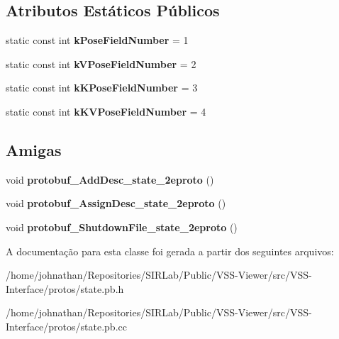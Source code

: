 \subsection*{Atributos Estáticos Públicos}
\begin{DoxyCompactItemize}
\item 
static const int {\bfseries k\+Pose\+Field\+Number} = 1\hypertarget{classvss__state_1_1Ball__State_aa0d51eebda087326095eff02cc80481c}{}\label{classvss__state_1_1Ball__State_aa0d51eebda087326095eff02cc80481c}

\item 
static const int {\bfseries k\+V\+Pose\+Field\+Number} = 2\hypertarget{classvss__state_1_1Ball__State_aa9df3d7a047296c119dfc35ae5e86b54}{}\label{classvss__state_1_1Ball__State_aa9df3d7a047296c119dfc35ae5e86b54}

\item 
static const int {\bfseries k\+K\+Pose\+Field\+Number} = 3\hypertarget{classvss__state_1_1Ball__State_a31603cacf64917d3088585f33290114a}{}\label{classvss__state_1_1Ball__State_a31603cacf64917d3088585f33290114a}

\item 
static const int {\bfseries k\+K\+V\+Pose\+Field\+Number} = 4\hypertarget{classvss__state_1_1Ball__State_a8d49de5cec51b6a22e828da61fa8810b}{}\label{classvss__state_1_1Ball__State_a8d49de5cec51b6a22e828da61fa8810b}

\end{DoxyCompactItemize}
\subsection*{Amigas}
\begin{DoxyCompactItemize}
\item 
void {\bfseries protobuf\+\_\+\+Add\+Desc\+\_\+state\+\_\+2eproto} ()\hypertarget{classvss__state_1_1Ball__State_aab1a2c258f8122a403a979ff57e2a706}{}\label{classvss__state_1_1Ball__State_aab1a2c258f8122a403a979ff57e2a706}

\item 
void {\bfseries protobuf\+\_\+\+Assign\+Desc\+\_\+state\+\_\+2eproto} ()\hypertarget{classvss__state_1_1Ball__State_a57d9367bc8a7a94ead11d11194cca1b6}{}\label{classvss__state_1_1Ball__State_a57d9367bc8a7a94ead11d11194cca1b6}

\item 
void {\bfseries protobuf\+\_\+\+Shutdown\+File\+\_\+state\+\_\+2eproto} ()\hypertarget{classvss__state_1_1Ball__State_a4e6dc5e8e72799859c4e9556d090e57d}{}\label{classvss__state_1_1Ball__State_a4e6dc5e8e72799859c4e9556d090e57d}

\end{DoxyCompactItemize}


A documentação para esta classe foi gerada a partir dos seguintes arquivos\+:\begin{DoxyCompactItemize}
\item 
/home/johnathan/\+Repositories/\+S\+I\+R\+Lab/\+Public/\+V\+S\+S-\/\+Viewer/src/\+V\+S\+S-\/\+Interface/protos/state.\+pb.\+h\item 
/home/johnathan/\+Repositories/\+S\+I\+R\+Lab/\+Public/\+V\+S\+S-\/\+Viewer/src/\+V\+S\+S-\/\+Interface/protos/state.\+pb.\+cc\end{DoxyCompactItemize}
